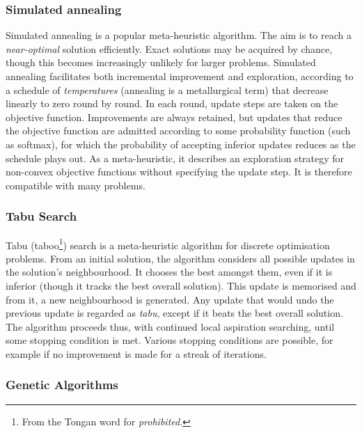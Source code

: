 \documentclass[11pt]{amsart}
\begin{document}
\subsubsection{Simulated annealing}

Simulated annealing is a popular meta-heuristic algorithm. The aim is to reach a \emph{near-optimal} solution efficiently. Exact solutions may be acquired by chance, though this becomes increasingly unlikely for larger problems. Simulated annealing facilitates both incremental improvement and exploration, according to a schedule of \emph{temperatures} (annealing is a metallurgical term) that decrease linearly to zero round by round. In each round, update steps are taken on the objective function. Improvements are always retained, but updates that reduce the objective function are admitted according to some probability function (such as softmax), for which the probability of accepting inferior updates reduces as the schedule plays out. As a meta-heuristic, it describes an exploration strategy for non-convex objective functions without specifying the update step. It is therefore compatible with many problems.

\subsubsection{Tabu Search}

Tabu (taboo\footnote{From the Tongan word for \emph{prohibited}.}) search is a meta-heuristic algorithm for discrete optimisation problems. From an initial solution, the algorithm considers all possible updates in the solution's neighbourhood. It chooses the best amongst them, even if it is inferior (though it tracks the best overall solution). This update is memorised and from it, a new neighbourhood is generated. Any update that would undo the previous update is regarded as \emph{tabu}, except if it beats the best overall solution. The algorithm proceeds thus, with continued local aspiration searching, until some stopping condition is met. Various stopping conditions are possible, for example if no improvement is made for a streak of iterations.

\subsubsection{Genetic Algorithms}
\end{document}
